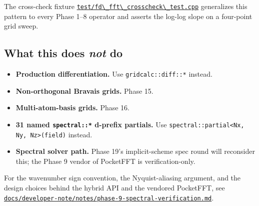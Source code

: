 The cross-check fixture
\href{../../../test/fd_fft_crosscheck_test.cpp}{\passthrough{\lstinline!test/fd\_fft\_crosscheck\_test.cpp!}}
generalizes this pattern to every Phase 1--8 operator and asserts the
log-log slope on a four-point grid sweep.

\subsection{\texorpdfstring{What this does \emph{not}
do}{What this does not do}}\label{what-this-does-not-do}

\begin{itemize}
\tightlist
\item
  \textbf{Production differentiation.} Use
  \passthrough{\lstinline!gridcalc::diff::*!} instead.
\item
  \textbf{Non-orthogonal Bravais grids.} Phase 15.
\item
  \textbf{Multi-atom-basis grids.} Phase 16.
\item
  \textbf{31 named \passthrough{\lstinline!spectral::*!} d-prefix
  partials.} Use
  \passthrough{\lstinline!spectral::partial<Nx, Ny, Nz>(field)!}
  instead.
\item
  \textbf{Spectral solver path.} Phase 19's implicit-scheme spec round
  will reconsider this; the Phase 9 vendor of PocketFFT is
  verification-only.
\end{itemize}

For the wavenumber sign convention, the Nyquist-aliasing argument, and
the design choices behind the hybrid API and the vendored PocketFFT, see
\href{../../developer-note/notes/phase-9-spectral-verification.md}{\passthrough{\lstinline!docs/developer-note/notes/phase-9-spectral-verification.md!}}.
